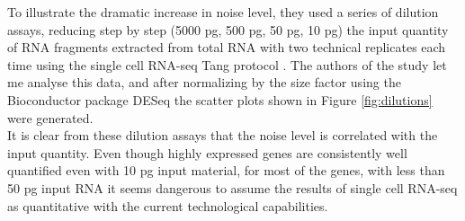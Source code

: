  To illustrate the dramatic increase in noise level, they used a series of dilution assays, reducing step by step (5000 pg, 500 pg, 50 pg, 10 pg) the input quantity of RNA fragments extracted from total  RNA with two technical replicates each time using the single cell RNA-seq Tang protocol \citep{tang09}. The authors of the study let me analyse this data, and after normalizing by the size factor using the Bioconductor package DESeq \citep{anders10} the scatter plots shown in Figure \ref{fig:dilutions} were generated. \\
  
  It is clear from these dilution assays that the noise level is correlated with the input quantity. Even though highly expressed genes are consistently well quantified even with 10 pg input material, for most of the genes, with less than 50 pg input RNA it seems dangerous to assume the results of single cell RNA-seq as quantitative with the current technological capabilities.
  
